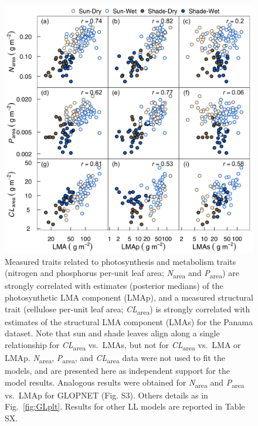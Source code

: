 \documentclass[
  12pt,
  a4paper,
,tablecaptionabove
]{scrartcl}
\begin{document}
\begin{figure}
\hypertarget{fig:PA-NPC}{%
\centering
\includegraphics{../figs/PA_NPC.png}
\caption{Measured traits related to photosynthesis and metabolism traits (nitrogen and phosphorus per-unit leaf area; \emph{N}\textsubscript{area} and \emph{P}\textsubscript{area}) are strongly correlated with estimates (posterior medians) of the photosynthetic LMA component (LMAp), and a measured structural trait (cellulose per-unit leaf area; \emph{CL}\textsubscript{area}) is strongly correlated with estimates of the structural LMA component (LMAs) for the Panama dataset.
Note that sun and shade leaves align along a single relationship for \emph{CL}\textsubscript{area} vs.~LMAs, but not for \emph{CL}\textsubscript{area} vs.~LMA or LMAp. \emph{N}\textsubscript{area}, \emph{P}\textsubscript{area}, and \emph{CL}\textsubscript{area} data were not used to fit the models, and are presented here as independent support for the model results.
Analogous results were obtained for \emph{N}\textsubscript{area} and \emph{P}\textsubscript{area} vs.~LMAp for GLOPNET (Fig. S3).
Others details as in Fig.~\ref{fig:GLplt}.
Results for other LL models are reported in Table SX.}\label{fig:PA-NPC}
}
\end{figure}
\end{document}
